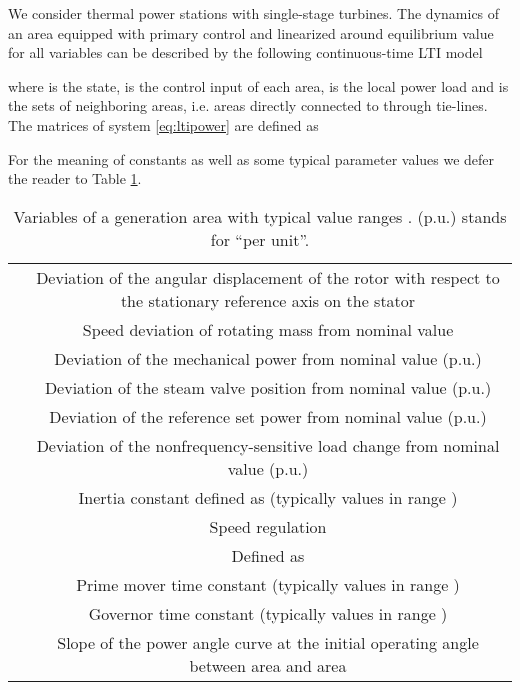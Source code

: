 \documentclass[a4paper]{article}
\begin{document}
          We consider thermal power stations with single-stage turbines. The dynamics of an area equipped with primary control and linearized around equilibrium value for all variables can be described by the following continuous-time LTI model \cite{Saadat2002}
          
          where  is the state,  is the control input of each area,  is the local power load and  is the sets of neighboring areas, i.e. areas directly connected to  through tie-lines. The matrices of system \eqref{eq:ltipower} are defined as
          
          For the meaning of constants as well as some typical parameter values we defer the reader to Table \ref{tab:networkparameter}.
          \begin{table}[!ht]
            \footnotesize
            \centering
            \begin{tabular}{|c|c|}
              \hline
               & Deviation of the angular displacement of the rotor with respect to the stationary reference axis on the stator \\
               & Speed deviation of rotating mass from nominal value\\
               & Deviation of the mechanical power from nominal value (p.u.)\\
               & Deviation of the steam valve position from nominal value (p.u.)\\
               & Deviation of the reference set power from nominal value (p.u.)\\
               & Deviation of the nonfrequency-sensitive load change from nominal value (p.u.)\\
               & Inertia constant defined as  (typically values in range ) \\
               & Speed regulation \\
               & Defined as  \\
               & Prime mover time constant (typically values in range )\\
               & Governor time constant (typically values in range ) \\
               & Slope of the power angle curve at the initial operating angle between area  and area  \\
              \hline
            \end{tabular}
            \caption{Variables of a generation area with typical value ranges \cite{Saadat2002}. (p.u.) stands for ``per unit''.}
            \label{tab:networkparameter}
          \end{table}
          \normalsize
\end{document}
